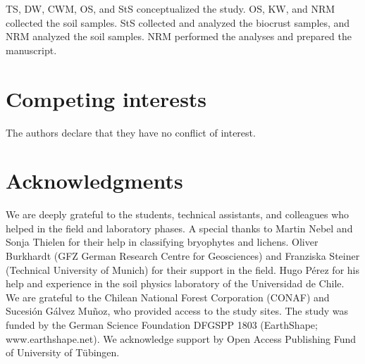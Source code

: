 TS, DW, CWM, OS, and StS conceptualized the study. OS, KW, and NRM collected the soil samples. StS collected and analyzed the biocrust samples, and NRM analyzed the soil samples. NRM performed the analyses and prepared the manuscript.

\section*{Competing interests}


The authors declare that they have no conflict of interest.

\section*{Acknowledgments}

We are deeply grateful to the students, technical assistants, and colleagues who helped in the field and laboratory phases. A special thanks to Martin Nebel and Sonja Thielen for their help in classifying bryophytes and lichens. Oliver Burkhardt (GFZ German Research Centre for Geosciences) and Franziska Steiner (Technical University of Munich) for their support in the field. Hugo Pérez for his help and experience in the soil physics laboratory of the Universidad de Chile. We are grateful to the Chilean National Forest Corporation (CONAF) and Sucesión Gálvez Muñoz, who provided access to the study sites. The study was funded by the German Science Foundation DFGSPP 1803 (EarthShape; www.earthshape.net). We acknowledge support by Open Access Publishing Fund of University of Tübingen.
